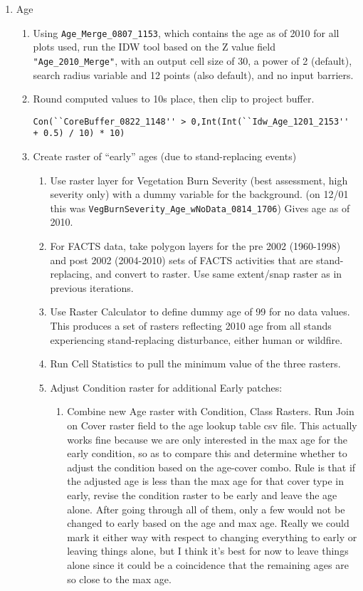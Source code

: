 \begin{enumerate}
    \item Age
    \begin{enumerate}
        \item Using \lstinline{Age_Merge_0807_1153}, which contains the age as of 2010 for all plots used, run the IDW tool based on the Z value field \lstinline{"Age_2010_Merge"}, with an output cell size of 30, a power of 2 (default), search radius variable and 12 points (also default), and no input barriers.
        \item Round computed values to 10s place, then clip to project buffer. 
\begin{lstlisting}
Con(``CoreBuffer_0822_1148'' > 0,Int(Int(``Idw_Age_1201_2153'' + 0.5) / 10) * 10)
\end{lstlisting}
        \item Create raster of ``early'' ages (due to stand-replacing events)
        \begin{enumerate}
            \item Use raster layer for Vegetation Burn Severity (best assessment, high severity only) with a dummy variable for the background. (on 12/01 this was \lstinline{VegBurnSeverity_Age_wNoData_0814_1706}) Gives age as of 2010.
            \item For FACTS data, take polygon layers for the pre 2002 (1960-1998) and post 2002 (2004-2010) sets of FACTS activities that are stand-replacing, and convert to raster. Use same extent/snap raster as in previous iterations.
            \item Use Raster Calculator to define dummy age of 99 for no data values. This produces a set of rasters reflecting 2010 age from all stands experiencing stand-replacing disturbance, either human or wildfire.
            \item Run Cell Statistics to pull the minimum value of the three rasters.
            \item Adjust Condition raster for additional Early patches:
                \begin{enumerate}
                \item Combine new Age raster with Condition, Class Rasters. Run Join on Cover raster field to the age lookup table csv file. This actually works fine because we are only interested in the max age for the early condition, so as to compare this and determine whether to adjust the condition based on the age-cover combo. Rule is that if the adjusted age is less than the max age for that cover type in early, revise the condition raster to be early and leave the age alone. After going through all of them, only a few would not be changed to early based on the age and max age. Really we could mark it either way with respect to changing everything to early or leaving things alone, but I think it's best for now to leave things alone since it could be a coincidence that the remaining ages are so close to the max age.

\end{enumerate}
\end{enumerate}
\end{enumerate}
\end{enumerate}
